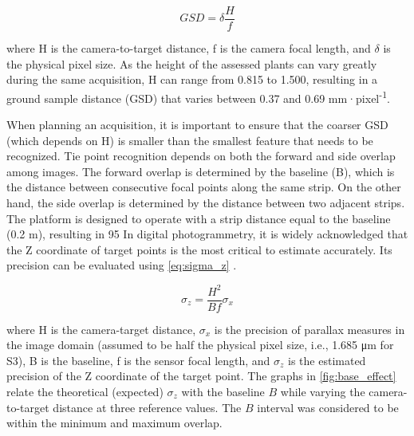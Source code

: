 \documentclass[12pt,a4paper,oneside]{report}
\begin{document}
\begin{equation}
    GSD = \delta \frac{H}{f}
    \label{eq:GSD}
\end{equation}

where H is the camera-to-target distance, f is the camera focal length, and $\delta$
 is the physical pixel size. As the height of the assessed plants can vary greatly during the same acquisition, H can range from 0.815 to 1.500, resulting in a ground sample distance (GSD) that varies between 0.37 and 0.69 mm·pixel\textsuperscript{-1}.

When planning an acquisition, it is important to ensure that the coarser GSD (which depends on H) is smaller than the smallest feature that needs to be recognized.
Tie point recognition depends on both the forward and side overlap among images. The forward overlap is determined by the baseline (B), which is the distance between consecutive focal points along the same strip. On the other hand, the side overlap is determined by the distance between two adjacent strips.
The platform is designed to operate with a strip distance equal to the baseline (0.2 m), resulting in 95%
In digital photogrammetry, it is widely acknowledged that the Z coordinate of target points is the most critical to estimate accurately. Its precision can be evaluated using
\cref{eq:sigma_z} \cite{depetrisRPASbasedPhotogrammetrySupport2020,borgognomondinoMultitemporalImageCoregistration2015,krausPhotogrammetryGeometryImages2011}.

\begin{equation}
    \sigma_z = \frac{H^2}{Bf} \sigma_x
    \label{eq:sigma_z}
\end{equation}

where H is the camera-target distance, $\sigma_x$ is the precision of parallax measures in the image domain (assumed to be half the physical pixel size, i.e., 1.685 μm for S3), B is the baseline, f is the sensor focal length, and 
$\sigma_z$ is the estimated precision of the Z coordinate of the target point.
The graphs in \cref{fig:base_effect} relate the theoretical (expected) $\sigma_z$ with the baseline $B$
while varying the camera-to-target distance at three reference values. The $B$
interval was considered to be within the minimum and maximum overlap.
\end{document}
